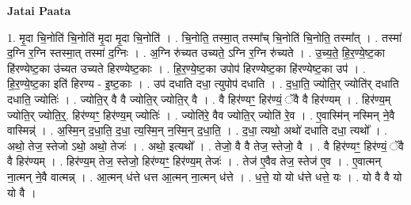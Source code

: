 \documentclass[17pt]{extarticle}
\begin{document}
\textbf{Jatai Paata} \newline

1. मृ॒दा चि॒नोति॑ चि॒नोति॑ मृ॒दा मृ॒दा चि॒नोति॑ । . चि॒नोति॒ तस्मा॒त् तस्मा᳚च् चि॒नोति॑ चि॒नोति॒ तस्मा᳚त् । . तस्मा॑ द॒ग्नि र॒ग्नि स्तस्मा॒त् तस्मा॑ द॒ग्निः । . अ॒ग्नि रु॑च्यत उच्यते॒ ऽग्नि र॒ग्नि रु॑च्यते । . उ॒च्य॒ते॒ हि॒र॒ण्ये॒ष्ट॒का हि॑रण्येष्ट॒का उ॑च्यत उच्यते हिरण्येष्ट॒काः । . हि॒र॒ण्ये॒ष्ट॒का उपोप॑ हिरण्येष्ट॒का हि॑रण्येष्ट॒का उप॑ । . हि॒र॒ण्ये॒ष्ट॒का इति॑ हिरण्य - इ॒ष्ट॒काः । . उप॑ दधाति दधा॒ त्युपोप॑ दधाति । . द॒धा॒ति॒ ज्योति॒र् ज्योति॑र् दधाति दधाति॒ ज्योतिः॑ । . ज्योति॒र् वै वै ज्योति॒र् ज्योति॒र् वै । . वै हिर॑ण्यꣳ॒॒ हिर॑ण्यं॒ ॅवै वै हिर॑ण्यम् । . हिर॑ण्य॒म् ज्योति॒र् ज्योति॒र्॒. हिर॑ण्यꣳ॒॒ हिर॑ण्य॒म् ज्योतिः॑ । . ज्योति॑रे॒ वैव ज्योति॒र् ज्योति॑ रे॒व । . ए॒वास्मि॑न् नस्मिन् ने॒वै वास्मिन्न्॑ । . अ॒स्मि॒न् द॒धा॒ति॒ द॒धा॒ त्य॒स्मि॒न् न॒स्मि॒न् द॒धा॒ति॒ । . द॒धा॒ त्यथो॒ अथो॑ दधाति दधा॒ त्यथो᳚ । . अथो॒ तेज॒ स्तेजो ऽथो॒ अथो॒ तेजः॑ । . अथो॒ इत्यथो᳚ । . तेजो॒ वै वै तेज॒ स्तेजो॒ वै । . वै हिर॑ण्यꣳ॒॒ हिर॑ण्यं॒ ॅवै वै हिर॑ण्यम् । . हिर॑ण्य॒म् तेज॒ स्तेजो॒ हिर॑ण्यꣳ॒॒ हिर॑ण्य॒म् तेजः॑ । . तेज॑ ए॒वैव तेज॒ स्तेज॑ ए॒व । . ए॒वात्मन् ना॒त्मन् ने॒वै वात्मन्न् । . आ॒त्मन् ध॑त्ते धत्त आ॒त्मन् ना॒त्मन् ध॑त्ते । . ध॒त्ते॒ यो यो ध॑त्ते धत्ते॒ यः । . यो वै वै यो यो वै । \newline
\end{document}
